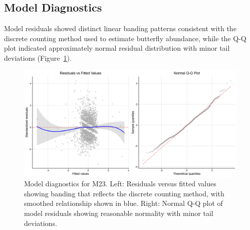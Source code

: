 

\subsection{Model Diagnostics}

Model residuals showed distinct linear banding patterns consistent with the discrete counting method used to estimate butterfly abundance, while the Q-Q plot indicated approximately normal residual distribution with minor tail deviations (Figure~\ref{fig:diagnostics}).

\begin{figure}[htbp]
\centering
\includegraphics[width=\textwidth]{figures/results/combined_diagnostics.png}
\caption{Model diagnostics for M23. Left: Residuals versus fitted values showing banding that reflects the discrete counting method, with smoothed relationship shown in blue. Right: Normal Q-Q plot of model residuals showing reasonable normality with minor tail deviations.}\label{fig:diagnostics}
\end{figure}

